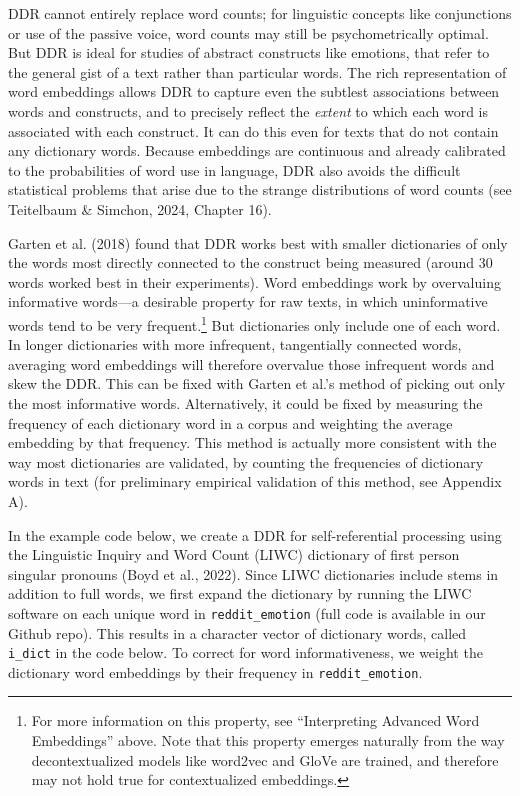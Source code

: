 \documentclass[
  man,
  floatsintext,
  longtable,
  nolmodern,
  notxfonts,
  notimes,
  colorlinks=true,linkcolor=blue,citecolor=blue,urlcolor=blue]{apa7}
\begin{document}
DDR cannot entirely replace word counts; for linguistic concepts like
conjunctions or use of the passive voice, word counts may still be
psychometrically optimal. But DDR is ideal for studies of abstract
constructs like emotions, that refer to the general gist of a text
rather than particular words. The rich representation of word embeddings
allows DDR to capture even the subtlest associations between words and
constructs, and to precisely reflect the \emph{extent} to which each
word is associated with each construct. It can do this even for texts
that do not contain any dictionary words. Because embeddings are
continuous and already calibrated to the probabilities of word use in
language, DDR also avoids the difficult statistical problems that arise
due to the strange distributions of word counts (see Teitelbaum \&
Simchon, 2024, Chapter 16).

Garten et al. (2018) found that DDR works best with smaller dictionaries
of only the words most directly connected to the construct being
measured (around 30 words worked best in their experiments). Word
embeddings work by overvaluing informative words---a desirable property
for raw texts, in which uninformative words tend to be very
frequent.\footnote{For more information on this property, see
  ``Interpreting Advanced Word Embeddings'' above. Note that this
  property emerges naturally from the way decontextualized models like
  word2vec and GloVe are trained, and therefore may not hold true for
  contextualized embeddings.} But dictionaries only include one of each
word. In longer dictionaries with more infrequent, tangentially
connected words, averaging word embeddings will therefore overvalue
those infrequent words and skew the DDR. This can be fixed with Garten
et al.'s method of picking out only the most informative words.
Alternatively, it could be fixed by measuring the frequency of each
dictionary word in a corpus and weighting the average embedding by that
frequency. This method is actually more consistent with the way most
dictionaries are validated, by counting the frequencies of dictionary
words in text (for preliminary empirical validation of this method, see
Appendix A).

In the example code below, we create a DDR for self-referential
processing using the Linguistic Inquiry and Word Count (LIWC) dictionary
of first person singular pronouns (Boyd et al., 2022). Since LIWC
dictionaries include stems in addition to full words, we first expand
the dictionary by running the LIWC software on each unique word in
\texttt{reddit\_emotion} (full code is available in our Github repo).
This results in a character vector of dictionary words, called
\texttt{i\_dict} in the code below. To correct for word informativeness,
we weight the dictionary word embeddings by their frequency in
\texttt{reddit\_emotion}.
\end{document}
